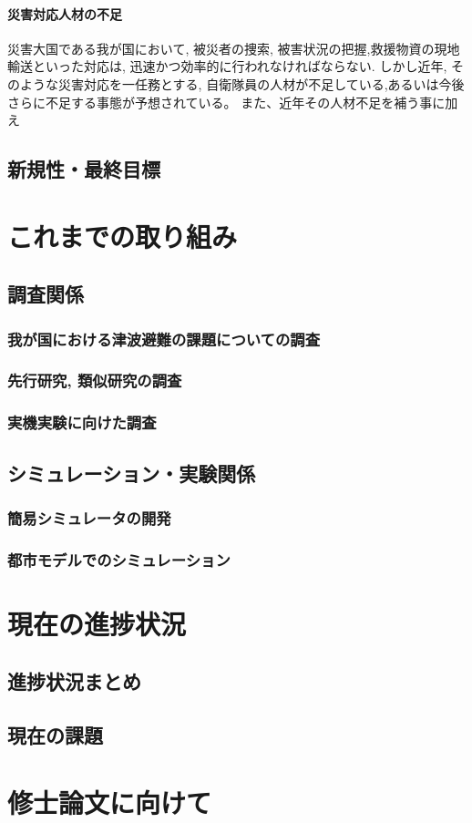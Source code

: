 \documentclass{article}[jsarticle]
\begin{document}
\paragraph{災害対応人材の不足}
災害大国である我が国において, 被災者の捜索, 被害状況の把握,救援物資の現地輸送といった対応は, 迅速かつ効率的に行われなければならない.
しかし近年, そのような災害対応を一任務とする, 自衛隊員の人材が不足している,あるいは今後さらに不足する事態が予想されている。
また、近年その人材不足を補う事に加え


\subsection{新規性・最終目標}
\section{これまでの取り組み}
\subsection{調査関係}
\subsubsection{我が国における津波避難の課題についての調査}
\label{sec:research-sec1}
\subsubsection{先行研究, 類似研究の調査}
\subsubsection{実機実験に向けた調査}
\subsection{シミュレーション・実験関係}
\subsubsection{簡易シミュレータの開発}
\subsubsection{都市モデルでのシミュレーション}
\section{現在の進捗状況}
\subsection{進捗状況まとめ}
\subsection{現在の課題}
\section{修士論文に向けて}
\appendix
\end{document}
